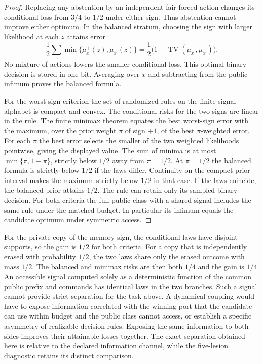 \documentclass[11pt,a4paper]{article}
\theoremstyle{definition}
\begin{document}
\begin{proof}
Replacing any abstention by an independent fair forced action changes its conditional loss from $3/4$ to $1/2$ under either sign. Thus abstention cannot improve either optimum. In the balanced stratum, choosing the sign with larger likelihood at each $z$ attains error
\[
 \frac12\sum_z\min\{\mu_x^+(z),\mu_x^-(z)\}
 =\frac12\bigl(1-\operatorname{TV}(\mu_x^+,\mu_x^-)\bigr).
\]
No mixture of actions lowers the smaller conditional loss. This optimal binary decision is stored in one bit. Averaging over $x$ and subtracting from the public infimum proves the balanced formula.

For the worst-sign criterion the set of randomized rules on the finite signal alphabet is compact and convex. The conditional risks for the two signs are linear in the rule. The finite minimax theorem equates the best worst-sign error with the maximum, over the prior weight $\pi$ of sign $+1$, of the best $\pi$-weighted error. For each $\pi$ the best error selects the smaller of the two weighted likelihoods pointwise, giving the displayed value. The sum of minima is at most $\min\{\pi,1-\pi\}$, strictly below $1/2$ away from $\pi=1/2$. At $\pi=1/2$ the balanced formula is strictly below $1/2$ if the laws differ. Continuity on the compact prior interval makes the maximum strictly below $1/2$ in that case. If the laws coincide, the balanced prior attains $1/2$. The rule can retain only its sampled binary decision. For both criteria the full public class with a shared signal includes the same rule under the matched budget. In particular its infimum equals the candidate optimum under symmetric access.
\end{proof}

For the private copy of the memory sign, the conditional laws have disjoint supports, so the gain is $1/2$ for both criteria. For a copy that is independently erased with probability $1/2$, the two laws share only the erased outcome with mass $1/2$. The balanced and minimax risks are then both $1/4$ and the gain is $1/4$. An accessible signal computed solely as a deterministic function of the common public prefix and commands has identical laws in the two branches. Such a signal cannot provide strict separation for the task above. A dynamical coupling would have to expose information correlated with the winning port that the candidate can use within budget and the public class cannot access, or establish a specific asymmetry of realizable decision rules. Exposing the same information to both sides improves their attainable losses together. The exact separation obtained here is relative to the declared information channel, while the five-lesion diagnostic retains its distinct comparison.
\end{document}
